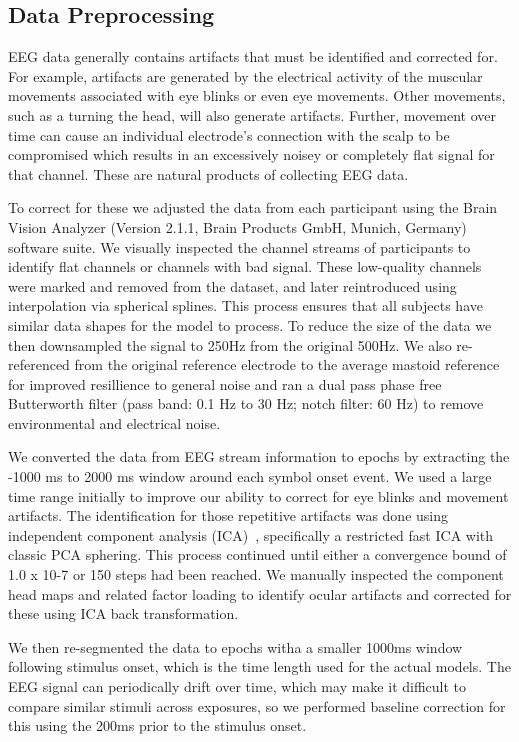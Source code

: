 \subsection{Data Preprocessing}
\label{sec:preprocessing}
EEG data generally contains artifacts that must be identified and corrected for. For example, artifacts are generated by the electrical activity of the muscular movements associated with eye blinks or even eye movements. Other movements, such as a turning the head, will also generate artifacts. Further, movement over time can cause an individual electrode's connection with the scalp to be compromised which results in an excessively noisey or completely flat signal for that channel. These are natural products of collecting EEG data. 

To correct for these we adjusted the data from each participant using the Brain Vision Analyzer (Version 2.1.1, Brain Products GmbH, Munich, Germany) software suite. We visually inspected the channel streams of participants to identify flat channels or channels with bad signal. These low-quality channels were marked and removed from the dataset, and later reintroduced using interpolation via spherical splines. This process ensures that all subjects have similar data shapes for the model to process. To reduce the size of the data we then downsampled the signal to 250Hz from the original 500Hz. We also re-referenced from the original reference electrode to the average mastoid reference for improved resillience to general noise and ran a dual pass phase free Butterworth filter (pass band: 0.1 Hz to 30 Hz; notch filter: 60 Hz) to remove environmental and electrical noise.

We converted the data from EEG stream information to epochs by extracting the -1000 ms to 2000 ms window around each symbol onset event. We used a large time range initially to improve our ability to correct for eye blinks and movement artifacts. The identification for those repetitive artifacts was done using independent component analysis (ICA)~\cite{luck2014introduction}, specifically a restricted fast ICA with classic PCA sphering. This process continued until either a convergence bound of 1.0 x 10-7 or 150 steps had been reached. We manually inspected the component head maps and related factor loading to identify ocular artifacts and corrected for these using ICA back transformation. 

We then re-segmented the data to epochs witha a smaller 1000ms window following stimulus onset, which is the time length used for the actual models. The EEG signal can periodically drift over time, which may make it difficult to compare similar stimuli across exposures, so we performed baseline correction for this using the 200ms prior to the stimulus onset. 

